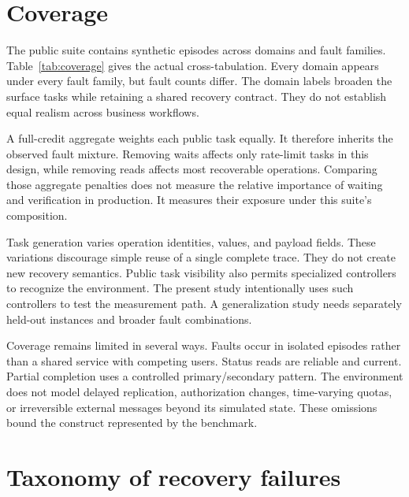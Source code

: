 \documentclass{article}
\begin{document}
\section{Coverage}
The public suite contains \NTasks{} synthetic episodes across \NDomains{} domains and \NFaults{} fault families. Table~\ref{tab:coverage} gives the actual cross-tabulation. Every domain appears under every fault family, but fault counts differ. The domain labels broaden the surface tasks while retaining a shared recovery contract. They do not establish equal realism across business workflows.\par
\begin{table}[ht]\centering\caption{Observed public task inventory. These are fixed counts, not estimated rates.}\label{tab:coverage}\end{table}

A full-credit aggregate weights each public task equally. It therefore inherits the observed fault mixture. Removing waits affects only rate-limit tasks in this design, while removing reads affects most recoverable operations. Comparing those aggregate penalties does not measure the relative importance of waiting and verification in production. It measures their exposure under this suite's composition.\par
Task generation varies operation identities, values, and payload fields. These variations discourage simple reuse of a single complete trace. They do not create new recovery semantics. Public task visibility also permits specialized controllers to recognize the environment. The present study intentionally uses such controllers to test the measurement path. A generalization study needs separately held-out instances and broader fault combinations.\par
Coverage remains limited in several ways. Faults occur in isolated episodes rather than a shared service with competing users. Status reads are reliable and current. Partial completion uses a controlled primary/secondary pattern. The environment does not model delayed replication, authorization changes, time-varying quotas, or irreversible external messages beyond its simulated state. These omissions bound the construct represented by the benchmark.\par
\section{Taxonomy of recovery failures}
\end{document}
